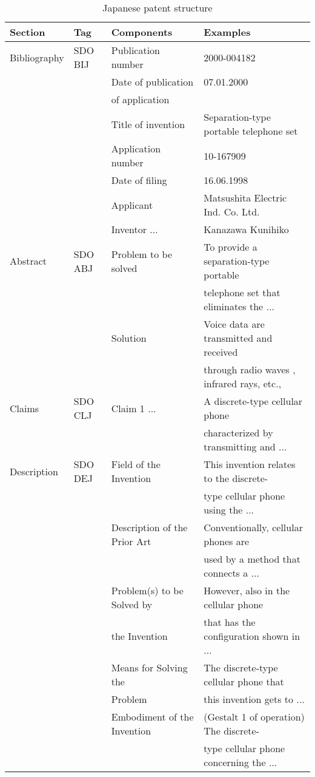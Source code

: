 \documentclass[english]{jnlp_1.2c}
\begin{document}
\begin{table}[b]
\caption{Japanese patent structure}
\label{tab:patent_ex}
    \begin{tabular}{|l|l|l|l|} \hline
Section & Tag & Components & Examples \\
\hline
Bibliography & SDO BIJ & Publication number & 2000-004182\\
	&	& Date of publication & 07.01.2000 \\
	&	& of application &  \\
	&	& Title of invention & Separation-type portable telephone set \\
	&	& Application number & 10-167909 \\
	&	& Date of filing & 16.06.1998\\
	&	& Applicant & Matsushita Electric Ind. Co. Ltd. \\
	&	& Inventor ... & Kanazawa Kunihiko \\
\hline
Abstract & SDO ABJ & Problem to be solved & To provide a separation-type portable \\
	&	&	& telephone set that eliminates the ...         \\
	&	& Solution & Voice data are transmitted and received       \\
	&	&	& through radio waves , infrared rays, etc.,       \\
\hline
Claims & SDO CLJ & Claim 1 ... & A discrete-type cellular phone \\
	&	&	& characterized by transmitting and ...          \\
\hline
Description & SDO DEJ & Field of the Invention & This invention relates to the discrete- \\
	&	&	& type cellular phone using the ... \\
	&	& Description of the Prior Art & Conventionally, cellular phones are \\
	&	&	& used by a method that connects a ... \\
	&	& Problem(s) to be Solved by & However, also in the cellular phone \\
	&	& the Invention & that has the configuration shown in ... \\
	&	& Means for Solving the        & The discrete-type cellular phone that \\
	&	& Problem & this invention gets  to ... \\
	&	& Embodiment of the Invention & (Gestalt 1 of operation) The discrete- \\
	&	&	& type cellular phone concerning the ... \\

\end{tabular}
\end{table}
\end{document}
